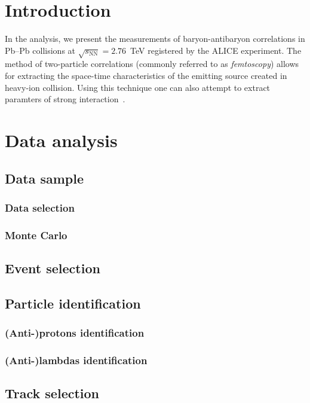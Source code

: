 \newpage
\section{Introduction}
\label{sec:overview}
In the analysis, we present the measurements of baryon-antibaryon correlations in Pb--Pb collisions at $\sqrt{s_{\mathrm{NN}}}=2.76$~TeV registered by the ALICE experiment. The method of two-particle correlations (commonly referred to as \emph{femtoscopy})  allows for extracting the space-time characteristics of the emitting source created in heavy-ion collision. Using this technique one can also attempt to extract paramters of strong interaction~\cite{}.

\section{Data analysis}
\label{sec:analysis}
\subsection{Data sample}
\subsubsection{Data selection}

\subsubsection{Monte Carlo}

\subsection{Event selection}
\subsection{Particle identification}
\subsubsection{(Anti-)protons identification}
\subsubsection{(Anti-)lambdas identification}


\subsection{Track selection}

